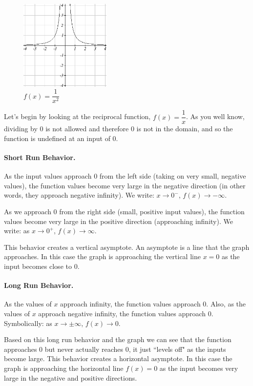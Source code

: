 \begin{figure}[!ht]
\centering
\includegraphics[width=0.4\textwidth]{img/chap1/sec1-5/image069.png}
\caption{$f(x)=\dfrac{1}{x^2}$}
\end{figure}

Let's begin by looking at the reciprocal function, $f(x)=\dfrac{1}{x}$. As you well know, dividing by 0 is not allowed and therefore 0 is not in the domain, and so the function is undefined at an input of 0.

\paragraph*{Short Run Behavior.}
As the input values approach 0 from the left side (taking on very small, negative values), the function values become very large in the negative direction (in other words, they approach negative infinity). We write: $x\to 0^-$, $f(x)\to -\infty$.

As we approach 0 from the right side (small, positive input values), the function values become very large in the positive direction (approaching infinity). We write: as $x\to 0^+$, $f(x)\to\infty$.

This behavior creates a vertical asymptote. An asymptote is a line that the graph approaches. In this case the graph is approaching the vertical line $x=0$ as the input becomes close to 0.

\paragraph*{Long Run Behavior.}
As the values of $x$ approach infinity, the function values approach 0. Also, as the values of $x$ approach negative infinity, the function values approach 0. Symbolically: as $x\to\pm\infty$, $f(x)\to 0$.

Based on this long run behavior and the graph we can see that the function approaches 0 but never actually reaches 0, it just ``levels off" as the inputs become large. This behavior creates a horizontal asymptote. In this case the graph is approaching the horizontal line $f(x)=0$ as the input becomes very large in the negative and positive directions.

